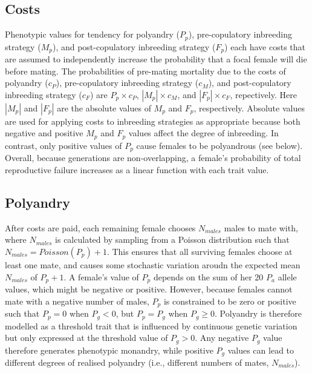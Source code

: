 \documentclass[10pt,letterpaper]{article}
\begin{document}
\subsection*{Costs}

Phenotypic values for tendency for polyandry ($P_{p}$), pre-copulatory inbreeding strategy ($M_{p}$), and post-copulatory inbreeding strategy ($F_{p}$) each have costs that are assumed to independently increase the probability that a focal female will die before mating. The probabilities of pre-mating mortality due to the costs of polyandry ($c_{P}$), pre-copulatory inbreeding strategy ($c_{M}$), and post-copulatory inbreeding strategy ($c_{F}$) are $P_{p} \times c_{P}$, $|M_{p}| \times c_{M}$, and $|F_{p}| \times c_{F}$, repectively. Here $|M_{p}|$ and $|F_{p}|$ are the absolute values of $M_{p}$ and $F_{p}$, respectively. Absolute values are used for applying costs to inbreeding strategies as appropriate because both negative and positive $M_{p}$ and $F_{p}$ values affect the degree of inbreeding. In contrast, only positive values of $P_{p}$ cause females to be polyandrous (see below). Overall, because generations are non-overlapping, a female's probability of total reproductive failure increases as a linear function with each trait value.

\subsection*{Polyandry}

After costs are paid, each remaining female chooses $N_{males}$ males to mate with, where $N_{males}$ is calculated by sampling from a Poisson distribution such that $N_{males} = Poisson(P_{p}) + 1$. This ensures that all surviving females choose at least one mate, and causes some stochastic variation aroudn the expected mean $N_{males}$ of $P_{p}+1$. A female's value of $P_{p}$ depends on the sum of her 20 $P_{a}$ allele values, which might be negative or positive. However, because females cannot mate with a negative number of males, $P_{p}$ is constrained to be zero or positive such that $P_{p} = 0$ when $P_{g} < 0$, but $P_{p} = P_{g}$ when $P_{g} \geq 0$. Polyandry is therefore modelled as a threshold trait \cite[][]{Lynch1998, Roff1996, Roff1998, Duthie} that is influenced by continuous genetic variation but only expressed at the threshold value of $P_{g} > 0$. Any negative $P_{g}$ value therefore generates phenotypic monandry, while positive $P_{g}$ values can lead to different degrees of realised polyandry (i.e., different numbers of mates, $N_{males}$).
\end{document}
